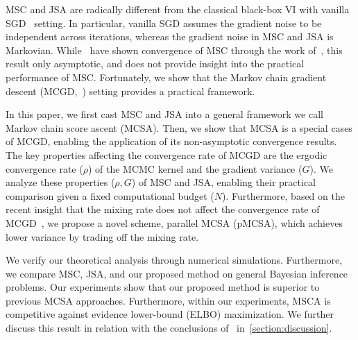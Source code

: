 MSC and JSA are radically different from the classical black-box VI with vanilla SGD~\citep{pmlr-v33-ranganath14, JMLR:v18:16-107} setting.
In particular, vanilla SGD assumes the gradient noise to be independent across iterations, whereas the gradient noise in MSC and JSA is Markovian.
While~\citet{NEURIPS2020_b2070693} have shown convergence of MSC through the work of~\citet{gu_stochastic_1998}, this result only asymptotic, and does not provide insight into the practical performance of MSC.
Fortunately, we show that the Markov chain gradient descent (MCGD,~\citealt{duchi_ergodic_2012, NEURIPS2018_1371bcce, pmlr-v99-karimi19a, doan_convergence_2020}) setting provides a practical framework.

In this paper, we first cast MSC and JSA into a general framework we call Markov chain score ascent (MCSA).
Then, we show that MCSA is a special cases of MCGD, enabling the application of its non-asymptotic convergence results.
The key properties affecting the convergence rate of MCGD are the ergodic convergence rate (\(\rho\)) of the MCMC kernel and the gradient variance (\(G\)).
We analyze these properties (\(\rho, G\)) of MSC and JSA, enabling their practical comparison given a fixed computational budget (\(N\)).
Furthermore, based on the recent insight that the mixing rate does not affect the convergence rate of MCGD~\citet{doan_convergence_2020,doan_finitetime_2020}, we propose a novel scheme, parallel MCSA (pMCSA), which achieves lower variance by trading off the mixing rate.

We verify our theoretical analysis through numerical simulations.
Furthermore, we compare MSC, JSA, and our proposed method on general Bayesian inference problems.
Our experiments show that our proposed method is superior to previous MCSA approaches.
Furthermore, within our experiments, MSCA is competitive against evidence lower-bound (ELBO) maximization.
We further discuss this result in relation with the conclusions of~\citet{dhaka_challenges_2021} in~\cref{section:discussion}.

\vspace{-0.05in}

